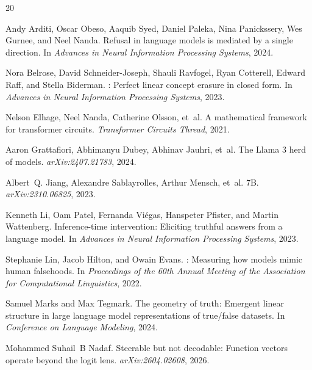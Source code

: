 \begin{thebibliography}{20}

Andy Arditi, Oscar Obeso, Aaquib Syed, Daniel Paleka, Nina Panickssery, Wes Gurnee, and Neel Nanda.
\newblock Refusal in language models is mediated by a single direction.
\newblock In \emph{Advances in Neural Information Processing Systems}, 2024.

Nora Belrose, David Schneider-Joseph, Shauli Ravfogel, Ryan Cotterell, Edward Raff, and Stella Biderman.
: Perfect linear concept erasure in closed form.
\newblock In \emph{Advances in Neural Information Processing Systems}, 2023.

Nelson Elhage, Neel Nanda, Catherine Olsson, et~al.
\newblock A mathematical framework for transformer circuits.
\newblock \emph{Transformer Circuits Thread}, 2021.

Aaron Grattafiori, Abhimanyu Dubey, Abhinav Jauhri, et~al.
\newblock The {Llama} 3 herd of models.
\newblock \emph{arXiv:2407.21783}, 2024.

Albert~Q. Jiang, Alexandre Sablayrolles, Arthur Mensch, et~al.
 7{B}.
\newblock \emph{arXiv:2310.06825}, 2023.

Kenneth Li, Oam Patel, Fernanda Vi\'egas, Hanspeter Pfister, and Martin Wattenberg.
\newblock Inference-time intervention: Eliciting truthful answers from a language model.
\newblock In \emph{Advances in Neural Information Processing Systems}, 2023.

Stephanie Lin, Jacob Hilton, and Owain Evans.
: Measuring how models mimic human falsehoods.
\newblock In \emph{Proceedings of the 60th Annual Meeting of the Association for Computational Linguistics}, 2022.

Samuel Marks and Max Tegmark.
\newblock The geometry of truth: Emergent linear structure in large language model representations of true/false datasets.
\newblock In \emph{Conference on Language Modeling}, 2024.

Mohammed Suhail~B Nadaf.
\newblock Steerable but not decodable: Function vectors operate beyond the logit lens.
\newblock \emph{arXiv:2604.02608}, 2026.


\end{thebibliography}
